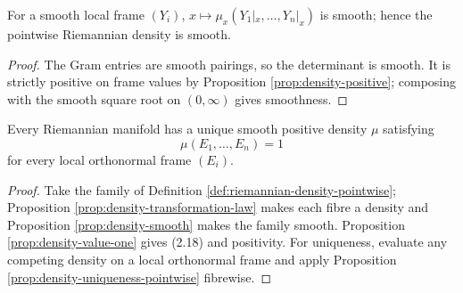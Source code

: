 \begin{proposition}
\label{prop:density-smooth}





For a smooth local frame $(Y_i)$, $x\mapsto\mu_x(Y_1|_x,\ldots,Y_n|_x)$ is smooth; hence the pointwise Riemannian density is smooth.
\end{proposition}

\begin{proof}

\sketch The Gram entries are smooth pairings, so the determinant is smooth. It is strictly positive on frame values by Proposition \ref{prop:density-positive}; composing with the smooth square root on $(0,\infty)$ gives smoothness.
\end{proof}

\begin{proposition}\label{prop:riemannian-density}





Every Riemannian manifold has a unique smooth positive density $\mu$ satisfying
\begin{equation}
\mu(E_1,\ldots,E_n)=1 \tag{2.18}
\end{equation}
for every local orthonormal frame $(E_i)$.
\end{proposition}

\begin{proof}

\sketch Take the family of Definition \ref{def:riemannian-density-pointwise}; Proposition \ref{prop:density-transformation-law} makes each fibre a density and Proposition \ref{prop:density-smooth} makes the family smooth. Proposition \ref{prop:density-value-one} gives (2.18) and positivity. For uniqueness, evaluate any competing density on a local orthonormal frame and apply Proposition \ref{prop:density-uniqueness-pointwise} fibrewise.
\end{proof}

